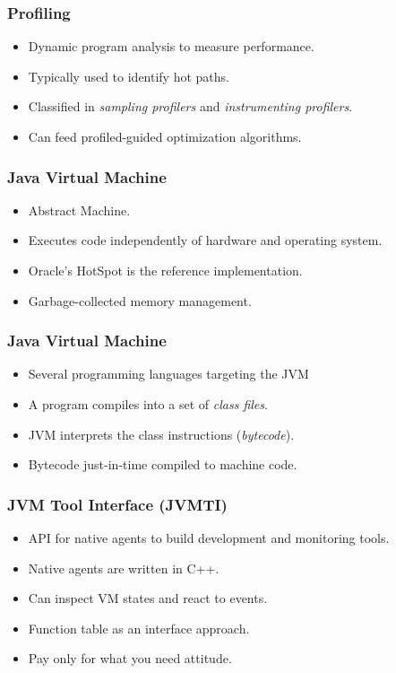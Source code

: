 \documentclass{beamer}
\begin{document}
\begin{frame}
\frametitle{Profiling}
\begin{itemize}
\item Dynamic program analysis to measure performance.
\item Typically used to identify hot paths.
\item Classified in \emph{sampling profilers} and \emph{instrumenting profilers}.
\item Can feed profiled-guided optimization algorithms.
\end{itemize}
\end{frame}

\begin{frame}
\frametitle{Java Virtual Machine}
\begin{itemize}
\item Abstract Machine.
\item Executes code independently of hardware and operating system.
\item Oracle's HotSpot is the reference implementation.
\item Garbage-collected memory management.
\end{itemize}
\end{frame}

\begin{frame}
\frametitle{Java Virtual Machine}
\begin{itemize}
\item Several programming languages targeting the JVM
\item A program compiles into a set of \emph{class files}.
\item JVM interprets the class instructions (\emph{bytecode}).
\item Bytecode just-in-time compiled to machine code.
\end{itemize}
\end{frame}

\begin{frame}
\frametitle{JVM Tool Interface (JVMTI)}
\begin{itemize}
\item API for native agents to build development and monitoring tools.
\item Native agents are written in C++.
\item Can inspect VM states and react to events.
\item Function table as an interface approach.
\item Pay only for what you need attitude.
\end{itemize}
\end{frame}
\end{document}

